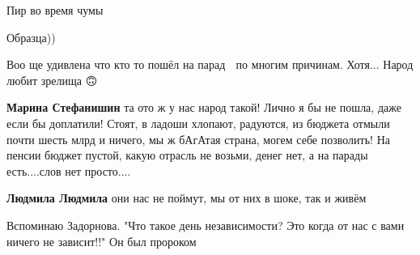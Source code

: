 \begin{itemize}
Пир во время чумы

 
Образца))

 
Воо ще удивлена что кто то пошёл на парад 🤔 по многим причинам. Хотя... Народ любит зрелища 🙃

\begin{itemize}
 
\textbf{Марина Стефанишин} та ото ж у нас народ такой! Лично я бы не пошла,
даже если бы доплатили! Стоят, в ладоши хлопают, радуются, из бюджета отмыли
почти шесть млрд и ничего, мы ж бАгАтая страна, могем себе позволить! На пенсии
бюджет пустой, какую отрасль не возьми, денег нет, а на парады есть....слов нет
просто....

 
\textbf{Людмила Людмила} они нас не поймут, мы от них в шоке, так и живём 🤯🤕😢
\end{itemize}

 
Вспоминаю Задорнова. "Что такое день независимости? Это когда от нас с вами ничего не зависит!!" Он был пророком

 

\end{itemize}
